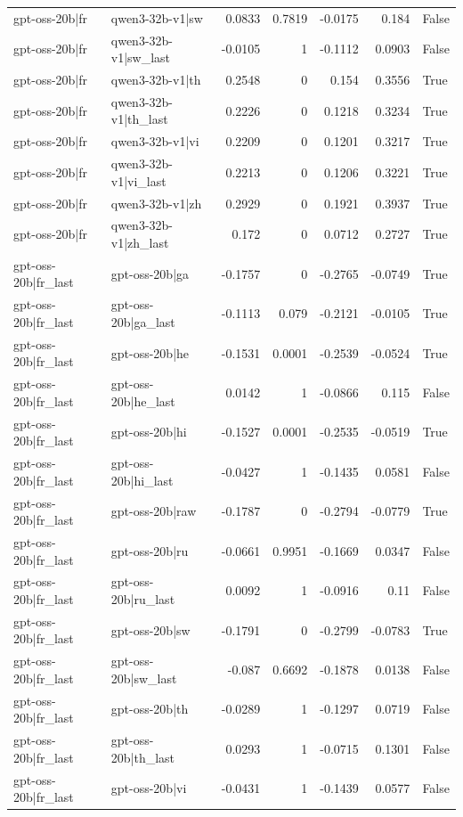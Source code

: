 \begin{table}
\begin{tabular}{l l r r r r l}
gpt-oss-20b|fr & qwen3-32b-v1|sw & 0.0833 & 0.7819 & -0.0175 & 0.184 & False \\
gpt-oss-20b|fr & qwen3-32b-v1|sw_last & -0.0105 & 1 & -0.1112 & 0.0903 & False \\
gpt-oss-20b|fr & qwen3-32b-v1|th & 0.2548 & 0 & 0.154 & 0.3556 & True \\
gpt-oss-20b|fr & qwen3-32b-v1|th_last & 0.2226 & 0 & 0.1218 & 0.3234 & True \\
gpt-oss-20b|fr & qwen3-32b-v1|vi & 0.2209 & 0 & 0.1201 & 0.3217 & True \\
gpt-oss-20b|fr & qwen3-32b-v1|vi_last & 0.2213 & 0 & 0.1206 & 0.3221 & True \\
gpt-oss-20b|fr & qwen3-32b-v1|zh & 0.2929 & 0 & 0.1921 & 0.3937 & True \\
gpt-oss-20b|fr & qwen3-32b-v1|zh_last & 0.172 & 0 & 0.0712 & 0.2727 & True \\
gpt-oss-20b|fr_last & gpt-oss-20b|ga & -0.1757 & 0 & -0.2765 & -0.0749 & True \\
gpt-oss-20b|fr_last & gpt-oss-20b|ga_last & -0.1113 & 0.079 & -0.2121 & -0.0105 & True \\
gpt-oss-20b|fr_last & gpt-oss-20b|he & -0.1531 & 0.0001 & -0.2539 & -0.0524 & True \\
gpt-oss-20b|fr_last & gpt-oss-20b|he_last & 0.0142 & 1 & -0.0866 & 0.115 & False \\
gpt-oss-20b|fr_last & gpt-oss-20b|hi & -0.1527 & 0.0001 & -0.2535 & -0.0519 & True \\
gpt-oss-20b|fr_last & gpt-oss-20b|hi_last & -0.0427 & 1 & -0.1435 & 0.0581 & False \\
gpt-oss-20b|fr_last & gpt-oss-20b|raw & -0.1787 & 0 & -0.2794 & -0.0779 & True \\
gpt-oss-20b|fr_last & gpt-oss-20b|ru & -0.0661 & 0.9951 & -0.1669 & 0.0347 & False \\
gpt-oss-20b|fr_last & gpt-oss-20b|ru_last & 0.0092 & 1 & -0.0916 & 0.11 & False \\
gpt-oss-20b|fr_last & gpt-oss-20b|sw & -0.1791 & 0 & -0.2799 & -0.0783 & True \\
gpt-oss-20b|fr_last & gpt-oss-20b|sw_last & -0.087 & 0.6692 & -0.1878 & 0.0138 & False \\
gpt-oss-20b|fr_last & gpt-oss-20b|th & -0.0289 & 1 & -0.1297 & 0.0719 & False \\
gpt-oss-20b|fr_last & gpt-oss-20b|th_last & 0.0293 & 1 & -0.0715 & 0.1301 & False \\
gpt-oss-20b|fr_last & gpt-oss-20b|vi & -0.0431 & 1 & -0.1439 & 0.0577 & False \\

\end{tabular}
\end{table}
